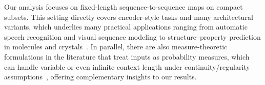 \documentclass{article}
\newtheorem{example}{Example}
\newcommand{\lt}[1]{{\footnotesize\textcolor{cyan!60!black}{\tt TL: #1}}}
\begin{document}
Our analysis focuses on fixed-length sequence-to-sequence maps on compact subsets. This setting directly covers encoder-style tasks and many architectural variants,
which underlies many practical applications ranging from automatic speech recognition and visual sequence modeling to structure–property prediction in molecules and crystals~\cite{radford2019language,zheng2021rethinking,hatamizadeh2022unetr,jiao2023crystal,jumper2021highly}.
In parallel, there are also measure-theoretic formulations in the literature that treat inputs as probability measures, which can handle variable or even infinite context length under continuity/regularity assumptions~\cite{furuya2024transformers,geshkovski2024measure,geshkovski2025mathematical}, offering complementary insights to our results.




\end{document}
